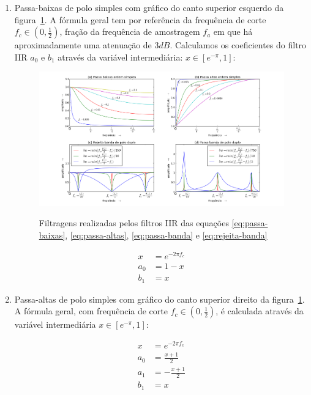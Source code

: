 \begin{enumerate}
\item Passa-baixas de polo simples com gráfico do canto superior esquerdo da figura~\ref{fig:iir}. A fórmula geral tem
por referência da frequência de corte $f_c \in (0,\frac{1}{2})$,
fração da frequência de amostragem $f_a$
em que há aproximadamente uma atenuação de $3dB$.
Calculamos os coeficientes do filtro IIR
$a_0$ e $b_1$ 
através da variável intermediária: $x \in [e^{-\pi},1]$:

\begin{figure}[h!]
    \centering
    \caption{Filtragens realizadas pelos filtros IIR das equações \ref{eq:passa-baixas}, \ref{eq:passa-altas}, \ref{eq:passa-banda} e \ref{eq:rejeita-banda}}
        \includegraphics[width=\textwidth]{figuras/iir___}
        \label{fig:iir}
\end{figure}


\begin{equation}\label{eq:passa-baixas}
\begin{split}
x & =e^{-2\pi f_c} \\
a_0 & =  1-x \\
b_1 & =  x
\end{split}
\end{equation}

\item Passa-altas de polo simples com gráfico do canto superior direito da figura~\ref{fig:iir}. A fórmula geral,
com frequência de corte $f_c \in (0,\frac{1}{2})$, é calculada através da variável
intermediária $x \in [e^{-\pi},1]$:


\begin{equation}\label{eq:passa-altas}
\begin{split}
x & =e^{-2\pi f_c} \\
a_0 & =  \frac{x+1}{2} \\
a_1 & =  -\frac{x+1}{2} \\
b_1 & =  x
\end{split}
\end{equation}



\end{enumerate}

